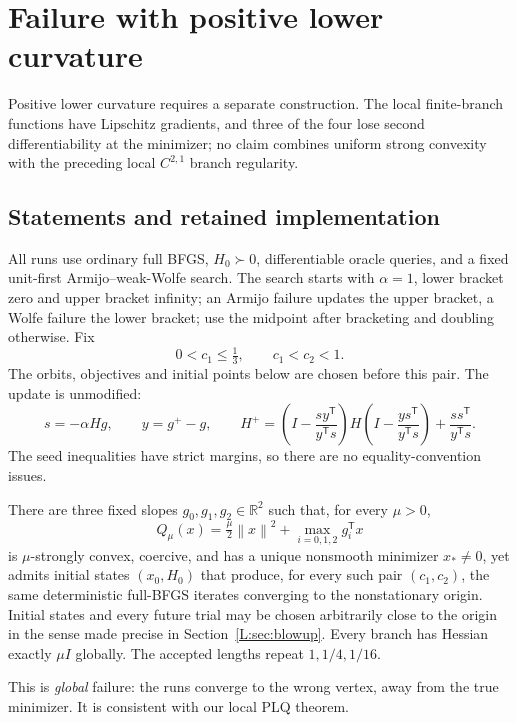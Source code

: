 \chapter{Failure with positive lower curvature}\label{comp:L}\label{L:chapter}
\renewcommand{\ModuleTag}{13}
Positive lower curvature requires a separate construction. The local finite-branch functions have Lipschitz gradients, and three of the four lose second differentiability at the minimizer; no claim combines uniform strong convexity with the preceding local $C^{2,1}$ branch regularity.


\begingroup
\providecommand{\R}{}
\renewcommand{\R}{\mathbb R}
\providecommand{\T}{}
\renewcommand{\T}{^{\mathsf T}}
\providecommand{\norm}{}
\renewcommand{\norm}[1]{\left\lVert#1\right\rVert}
\providecommand{\ip}{}
\renewcommand{\ip}[2]{\langle #1,#2\rangle}
\setcounter{section}{0}
\setcounter{theorem}{0}
\setcounter{lemma}{0}
\setcounter{corollary}{0}
\setcounter{proposition}{0}
\setcounter{remark}{0}
\setcounter{equation}{0}


\section{Statements and retained implementation}

All runs use ordinary full BFGS, $H_0\succ0$, differentiable oracle queries, and a fixed unit-first Armijo--weak-Wolfe search. The search starts with $\alpha=1$, lower bracket zero and upper bracket infinity; an Armijo failure updates the upper bracket, a Wolfe failure the lower bracket; use the midpoint after bracketing and doubling otherwise. Fix
\[
 0<c_1\le\tfrac13,\qquad c_1<c_2<1.
\]
The orbits, objectives and initial points below are chosen before this pair.
The update is unmodified:
\[
 s=-\alpha Hg,\qquad y=g^+-g,\qquad
 H^+=\left(I-\frac{sy\T}{y\T s}\right)H
 \left(I-\frac{ys\T}{y\T s}\right)+\frac{ss\T}{y\T s}.
\]
The seed inequalities have strict margins, so there are no equality-convention issues.

\begin{theorem}\label{L:thm:global}
There are three fixed slopes $g_0,g_1,g_2\in\R^2$ such that, for every $\mu>0$,
\[
 Q_\mu(x)=\tfrac\mu2\norm{x}^2+\max_{i=0,1,2}g_i\T x
\]
is $\mu$-strongly convex, coercive, and has a unique nonsmooth minimizer $x_*\ne0$, yet admits initial states $(x_0,H_0)$ that produce, for every such pair $(c_1,c_2)$, the same deterministic full-BFGS iterates converging to the nonstationary origin. Initial states and every future trial may be chosen arbitrarily close to the origin in the sense made precise in Section~\ref{L:sec:blowup}. Every branch has Hessian exactly $\mu I$ globally. The accepted lengths repeat $1,1/4,1/16$.
\end{theorem}
\noindent This is \emph{global} failure: the runs converge to the wrong vertex, away from the true minimizer. It is consistent with our local PLQ theorem.


